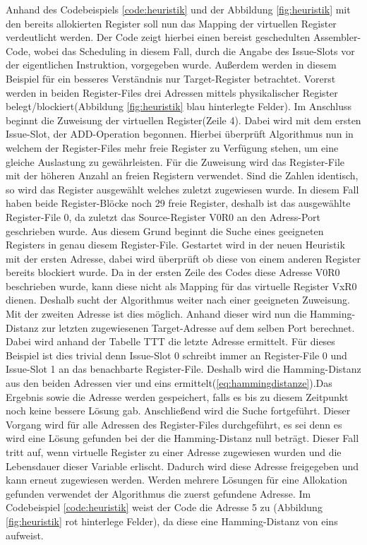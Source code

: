 Anhand des Codebeispiels \ref{code:heuristik} und der Abbildung \ref{fig:heuristik} mit den bereits allokierten Register soll nun das Mapping der virtuellen Register verdeutlicht werden.
Der Code zeigt hierbei einen bereist geschedulten Assembler-Code, wobei das Scheduling in diesem Fall, durch die Angabe des Issue-Slots vor der eigentlichen Instruktion, vorgegeben wurde. Außerdem werden in diesem Beispiel für ein besseres Verständnis nur Target-Register betrachtet.
Vorerst werden in beiden Register-Files drei Adressen mittels physikalischer Register belegt/blockiert(Abbildung \ref{fig:heuristik} blau hinterlegte Felder). Im Anschluss beginnt die Zuweisung der virtuellen Register(Zeile 4).
Dabei wird mit dem ersten Issue-Slot, der ADD-Operation begonnen. Hierbei  überprüft Algorithmus nun in welchem der Register-Files mehr freie Register zu Verfügung stehen, um eine gleiche Auslastung zu gewährleisten. Für die Zuweisung wird das Register-File mit der höheren Anzahl an freien Registern verwendet. Sind die Zahlen identisch, so wird das Register ausgewählt welches zuletzt zugewiesen wurde. In diesem Fall haben beide Register-Blöcke noch 29 freie Register, deshalb ist das ausgewählte Register-File 0, da zuletzt das Source-Register V0R0 an den Adress-Port geschrieben wurde.
Aus diesem Grund beginnt die Suche eines geeigneten Registers in genau diesem Register-File. Gestartet wird in der neuen Heuristik mit der ersten Adresse, dabei wird überprüft ob diese von einem anderen Register bereits blockiert wurde. Da in der ersten Zeile des Codes diese Adresse V0R0 beschrieben wurde, kann diese nicht als Mapping für das virtuelle Register VxR0 dienen. Deshalb sucht der Algorithmus weiter nach einer geeigneten Zuweisung. Mit der zweiten Adresse ist dies möglich. Anhand dieser wird nun die Hamming-Distanz zur letzten zugewiesenen Target-Adresse auf dem selben Port berechnet. Dabei wird anhand der Tabelle TTT die letzte Adresse ermittelt. Für dieses Beispiel ist dies trivial denn Issue-Slot 0 schreibt immer an Register-File 0 und Issue-Slot 1 an das benachbarte Register-File. Deshalb wird die Hamming-Distanz aus den beiden Adressen vier und eins ermittelt(\ref{eq:hammingdistanze}).Das Ergebnis sowie die Adresse werden gespeichert, falls es bis zu diesem Zeitpunkt noch keine bessere Lösung gab. Anschließend wird die Suche fortgeführt. Dieser Vorgang wird für alle Adressen des Register-Files durchgeführt, es sei denn es wird eine Lösung gefunden bei der die Hamming-Distanz null beträgt. Dieser Fall tritt auf, wenn virtuelle Register zu einer Adresse zugewiesen wurden und die Lebensdauer dieser Variable erlischt. Dadurch wird diese Adresse freigegeben und kann erneut zugewiesen werden.  Werden mehrere Lösungen für eine Allokation gefunden verwendet der Algorithmus die zuerst gefundene Adresse. Im Codebeispiel \ref{code:heuristik} weist der Code die Adresse 5 zu (Abbildung \ref{fig:heuristik} rot hinterlege Felder), da diese eine Hamming-Distanz von eins aufweist.
